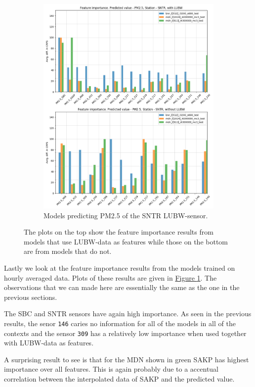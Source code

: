 \documentclass[12pt,a4paper,twoside]{scrartcl}
\numberwithin{equation}{section}
\newcommand{\reffig}[1]{\hyperref[#1]{Figure \ref*{#1}}}
\begin{document}
\begin{figure}[H]
\begin{subfigure}[t]{0.49\textwidth}
    \includegraphics[width=\textwidth,height=1.2\textwidth]{figures/figs_1h/feature_importance_CRPS_SNTR_P2}%
    \caption{Models predicting PM2.5 of the SNTR LUBW-sensor.}
  \end{subfigure}
  \caption[Feature importance (hourly average)]{The plots on the top show the feature importance results from models that use LUBW-data as features while those on the bottom are from models that do not.}\label{fig:feat-imp-1h}
\end{figure}
Lastly we look at the feature importance results from the models trained on hourly averaged data. Plots of these results are given in \reffig{fig:feat-imp-1h}. The observations that we can made here are essentially the same as the one in the previous sections.

The SBC and SNTR sensors have again high importance. As seen in the previous results, the senor \texttt{146} caries no information for all of the models in all of the contexts and the sensor \texttt{309} has a relatively low importance when used together with LUBW-data as features.

A surprising result to see is that for the MDN shown in green SAKP has highest importance over all features. This is again probably due to a accentual correlation between the interpolated data of SAKP and the predicted value.
\end{document}
